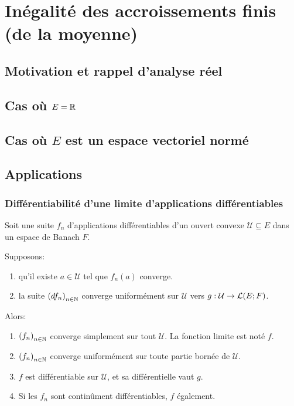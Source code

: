 \chapter{Inégalité des accroissements finis (de la moyenne)}

\section*{Motivation et rappel d'analyse réel}

\section{Cas où $E = \mathbb{R}$}

\section{Cas où $E$ est un espace vectoriel normé}

\section{Applications}

\subsection{Différentiabilité d'une limite d'applications différentiables}

\begin{corollary}
	Soit une suite $f_{n}$ d'applications différentiables d'un ouvert convexe
	$\mathcal{U} \subseteq E$ dans un espace de Banach $F$.
	
	Supposons:
	\begin{enumerate}
		\item qu'il existe $a \in \mathcal{U}$ tel que $f_{n}(a)$ converge.
		\item la suite ${(df_{n})}_{n \in \mathbb{N}}$ converge uniformément sur
			$\mathcal{U}$ vers
			$g : \mathcal{U} \rightarrow \mathcal{L}(E; F)$.
	\end{enumerate}

	Alors:

	\begin{enumerate}
		\item ${(f_{n})}_{n \in \mathbb{N}}$ converge simplement sur tout
			$\mathcal{U}$. La fonction limite est noté $f$.
		\item ${(f_{n})}_{n \in \mathbb{N}}$ converge uniformément sur toute
			partie bornée de $\mathcal{U}$.
		\item $f$ est différentiable sur $\mathcal{U}$, et sa différentielle
			vaut $g$.
		\item Si les $f_{n}$ sont continûment différentiables, $f$ également.
	\end{enumerate}
\end{corollary}

